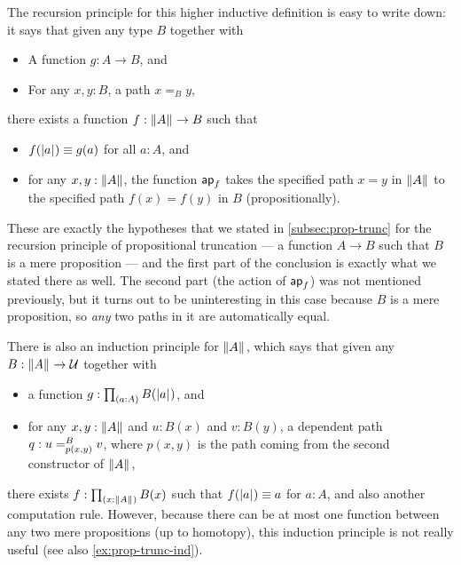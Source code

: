 The recursion principle for this higher inductive definition is easy to write down: it says that given any type $B$ together with
\begin{itemize}
\item A function $g:A\to B$, and
\item For any $x,y:B$, a path $x=_B y$,
\end{itemize}
there exists a function $f:\brck A \to B$ such that
\begin{itemize}
\item $f(\bproj a) \jdeq g(a)$ for all $a:A$, and
\item for any $x,y:\brck A$, the function $\apfunc f$ takes the specified path $x=y$ in $\brck A$ to the specified path $f(x) = f(y)$ in $B$ (propositionally).
\end{itemize}
These are exactly the hypotheses that we stated in \autoref{subsec:prop-trunc} for the recursion principle of propositional truncation --- a function $A\to B$ such that $B$ is a mere proposition --- and the first part of the conclusion is exactly what we stated there as well.
The second part (the action of $\apfunc f$) was not mentioned previously, but it turns out to be uninteresting in this case because $B$ is a mere proposition, so \emph{any} two paths in it are automatically equal.

There is also an induction principle for $\brck A$, which says that given any $B:\brck A \to \type$ together with
\begin{itemize}
\item a function $g:\prd{a:A} B(\bproj a)$, and
\item for any $x,y:\brck A$ and $u:B(x)$ and $v:B(y)$, a dependent path $q:\dpath{B}{p(x,y)}{u}{v}$, where $p(x,y)$ is the path coming from the second constructor of $\brck A$,
\end{itemize}
there exists $f:\prd{x:\brck A} B(x)$ such that $f(\bproj a)\jdeq a$ for $a:A$, and also another computation rule.
However, because there can be at most one function between any two mere propositions (up to homotopy), this induction principle is not really useful (see also \autoref{ex:prop-trunc-ind}).

